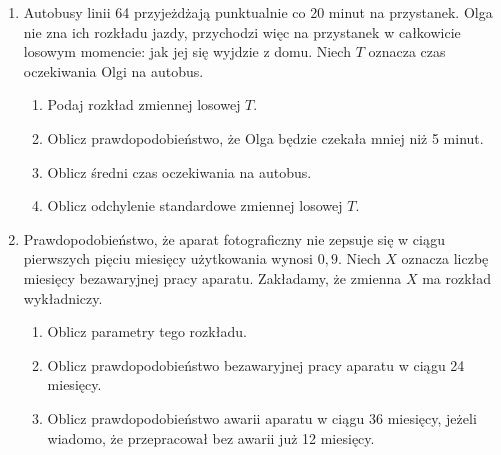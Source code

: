 \documentclass[twoside]{mwart}
\newcommand{\ans}[1]{}
\newcommand{\ans}[1]{\par\emph{Odpowiedź:} #1}
\begin{document}
\begin{enumerate}
\item Autobusy linii 64 przyjeżdżają punktualnie co 20 minut na przystanek. Olga nie zna ich rozkładu jazdy, przychodzi więc na przystanek w całkowicie losowym momencie: jak jej się wyjdzie z domu. Niech $T$ oznacza czas oczekiwania Olgi na autobus.
\begin{enumerate}
\item Podaj rozkład zmiennej losowej $T$. \ans{$f(t)=\begin{cases}\frac{1}{20} & 0\leq t\leq 20 \\ 0 & \text{wpp} \end{cases}$}
\item Oblicz prawdopodobieństwo, że Olga będzie czekała mniej niż 5 minut. \ans{$P(T<5)=F(5)=0{,}25$}
\item Oblicz średni czas oczekiwania na autobus. \ans{$ET=10$}
\item Oblicz odchylenie standardowe zmiennej losowej $T$. \ans{$DT=\sqrt{\frac{400}{12}}$}
\end{enumerate}
\item Prawdopodobieństwo, że aparat fotograficzny nie zepsuje się w ciągu pierwszych pięciu miesięcy użytkowania wynosi $0{,}9$. Niech $X$ oznacza liczbę miesięcy bezawaryjnej pracy aparatu. Zakładamy, że zmienna $X$ ma rozkład wykładniczy.
\begin{enumerate}
\item Oblicz parametry tego rozkładu. \ans{$P(X>5)=\exp(-\frac{5}{\lambda}) \quad \lambda=-\frac{5}{\ln 0{,}9}$}
\item Oblicz prawdopodobieństwo bezawaryjnej pracy aparatu w ciągu 24 miesięcy. \ans{$P(X>24)=1-F(24)$}
\item Oblicz prawdopodobieństwo awarii aparatu w ciągu 36 miesięcy, jeżeli wiadomo, że przepracował bez awarii już 12 miesięcy. \ans{$P(X<36|X>12)=P(X<36-12)=F(24)$}
\end{enumerate}

\end{enumerate}
\end{document}
